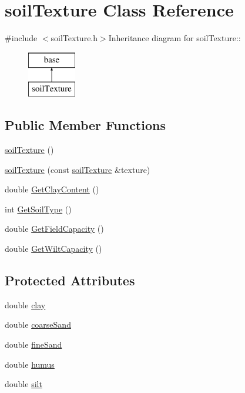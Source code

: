 \hypertarget{classsoil_texture}{
\section{soilTexture Class Reference}
\label{classsoil_texture}
}


{\ttfamily \#include $<$soilTexture.h$>$}Inheritance diagram for soilTexture::\begin{figure}[H]
\begin{center}
\leavevmode
\includegraphics[height=2cm]{classsoil_texture}
\end{center}
\end{figure}
\subsection*{Public Member Functions}
\begin{DoxyCompactItemize}
\item 
\hyperlink{classsoil_texture_a9254dd3e775bff9fc9a8b659ecb71b95}{soilTexture} ()
\item 
\hyperlink{classsoil_texture_af5fc74e4192be1b4a75d79727f3c5e92}{soilTexture} (const \hyperlink{classsoil_texture}{soilTexture} \&texture)
\item 
double \hyperlink{classsoil_texture_a859c98627b177ad8cd5248712c479ffd}{GetClayContent} ()
\item 
int \hyperlink{classsoil_texture_a68fb72c12e27351d8dd6722de8987abc}{GetSoilType} ()
\item 
double \hyperlink{classsoil_texture_a01e404ea4179af3bd610ed14611a5441}{GetFieldCapacity} ()
\item 
double \hyperlink{classsoil_texture_a226ec43e70dcd378705033c54aa853c2}{GetWiltCapacity} ()
\end{DoxyCompactItemize}
\subsection*{Protected Attributes}
\begin{DoxyCompactItemize}
\item 
double \hyperlink{classsoil_texture_ad669f0e201bf2ec1b9291d3c6063bb8f}{clay}
\item 
double \hyperlink{classsoil_texture_a83b33165990e9ffad222f362ae15a86a}{coarseSand}
\item 
double \hyperlink{classsoil_texture_a07bda38527ba3925d216db999faa4049}{fineSand}
\item 
double \hyperlink{classsoil_texture_a7d51a7c46adff457f90044b9f71fb9e0}{humus}
\item 
double \hyperlink{classsoil_texture_a5b05cdfbcf202642e069c8296a23e272}{silt}
\end{DoxyCompactItemize}


